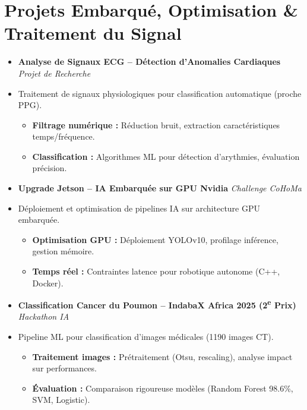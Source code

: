 \documentclass[a4paper,11pt]{article}
\begin{document}
\section{Projets Embarqué, Optimisation \& Traitement du Signal}
\begin{itemize}[leftmargin=*, label={}]

\item \textbf{Analyse de Signaux ECG -- Détection d'Anomalies Cardiaques} \hfill \textit{Projet de Recherche}
\vspace{-2pt}
\item \small{Traitement de signaux physiologiques pour classification automatique (proche PPG).}
    \begin{itemize}[leftmargin=0.4cm, nosep, label=\tiny$\bullet$]
        \item \small{\textbf{Filtrage numérique :} Réduction bruit, extraction caractéristiques temps/fréquence.}
        \item \small{\textbf{Classification :} Algorithmes ML pour détection d'arythmies, évaluation précision.}
    \end{itemize}
    \vspace{3pt}

\item \textbf{Upgrade Jetson -- IA Embarquée sur GPU Nvidia} \hfill \textit{Challenge CoHoMa}
\vspace{-2pt}
\item \small{Déploiement et optimisation de pipelines IA sur architecture GPU embarquée.}
    \begin{itemize}[leftmargin=0.4cm, nosep, label=\tiny$\bullet$]
        \item \small{\textbf{Optimisation GPU :} Déploiement YOLOv10, profilage inférence, gestion mémoire.}
        \item \small{\textbf{Temps réel :} Contraintes latence pour robotique autonome (C++, Docker).}
    \end{itemize}
    \vspace{3pt}

\item \textbf{Classification Cancer du Poumon -- IndabaX Africa 2025 (2\textsuperscript{e} Prix)} \hfill \textit{Hackathon IA}
\vspace{-2pt}
\item \small{Pipeline ML pour classification d'images médicales (1190 images CT).}
    \begin{itemize}[leftmargin=0.4cm, nosep, label=\tiny$\bullet$]
        \item \small{\textbf{Traitement images :} Prétraitement (Otsu, rescaling), analyse impact sur performances.}
        \item \small{\textbf{Évaluation :} Comparaison rigoureuse modèles (Random Forest 98.6\%, SVM, Logistic).}
    \end{itemize}
    \vspace{3pt}


\end{itemize}
\end{document}
